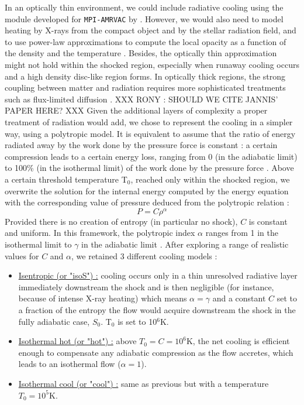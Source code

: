 \documentclass{aa}
\begin{document}
In an optically thin environment, we could include radiative cooling using the module developed for \texttt{MPI-AMRVAC} by \cite{VanMarle2011}. However, we would also need to model heating by X-rays from the compact object and by the stellar radiation field, and to use power-law approximations to compute the local opacity as a function of the density and the temperature \citep{Lin1985}. Besides, the optically thin approximation might not hold within the shocked region, especially when runaway cooling occurs and a high density disc-like region forms. In optically thick regions, the strong coupling between matter and radiation requires more sophisticated treatments such as flux-limited diffusion \citep{Turner2001}. XXX RONY : SHOULD WE CITE JANNIS' PAPER HERE? XXX Given the additional layers of complexity a proper treatment of radiation would add, we chose to represent the cooling in a simpler way, using a polytropic model. It is equivalent to assume that the ratio of energy radiated away by the work done by the pressure force is constant : a certain compression leads to a certain energy loss, ranging from 0 (in the adiabatic limit) to 100\% (in the isothermal limit) of the work done by the pressure force \citep{Christians2012}. Above a certain threshold temperature T$_{0}$, reached only within the shocked region, we overwrite the solution for the internal energy computed by the energy equation with the corresponding value of pressure deduced from the polytropic relation :
\begin{equation}
P=C\rho^{\alpha}
\end{equation}
Provided there is no creation of entropy (in particular no shock), $C$ is constant and uniform. In this framework, the polytropic index $\alpha$ ranges from 1 in the isothermal limit to $\gamma$ in the adiabatic limit \citep{Horedt2000}. After exploring a range of realistic values for $C$ and $\alpha$, we retained 3 different cooling models :
\begin{itemize}
\item \underline{Isentropic (or "isoS") :} cooling occurs only in a thin unresolved radiative layer immediately downstream the shock and is then negligible (for instance, because of intense X-ray heating) which means $\alpha=\gamma$ and a constant $C$ set to a fraction of the entropy the flow would acquire downstream the shock in the fully adiabatic case, $S_0$. T$_{0}$ is set to 10$^6$K.
\item \underline{Isothermal hot (or "hot") :} above $T_0=C=10^6$K, the net cooling is efficient enough to compensate any adiabatic compression as the flow accretes, which leads to an isothermal flow ($\alpha=1$).
\item \underline{Isothermal cool (or "cool") :} same as previous but with a temperature $T_0=10^5$K.
\end{itemize}
\end{document}
